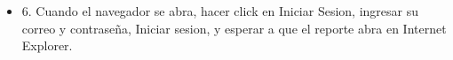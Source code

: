 \begin{itemize}
\item 6. Cuando el navegador se abra, hacer click en Iniciar Sesion, ingresar su correo y contraseña, Iniciar sesion, y esperar a que el reporte abra en Internet Explorer. \\

\end{itemize}